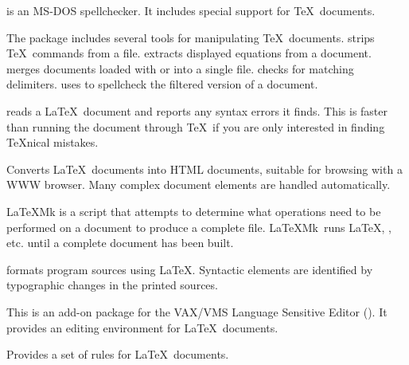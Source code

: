 
 is an MS-DOS spellchecker.  It includes special support
for \TeX\ documents.

\newpage
{}

The  package includes several tools for manipulating
\TeX\ documents.  strips \TeX\ commands from a file.
 extracts displayed equations from a document. 
 merges documents loaded with \verb|| or
\verb|| into a single file.  checks for
matching delimiters.   uses  to 
spellcheck the filtered version of a document.


 reads a \LaTeX\ document and reports any syntax
errors it finds.  This is faster than running the document through
\TeX\ if you are only interested in finding \TeX{}nical mistakes.


Converts \LaTeX\ documents into HTML documents, suitable for
browsing with a WWW browser.  Many complex document elements are handled
automatically.


\LaTeX{}Mk is a  script that attempts to determine what operations
need to be performed on a document to produce a complete 
 file.  \LaTeX{}Mk\ runs \LaTeX, \BibTeX, etc. until a complete
document has been built.


 formats program sources using \LaTeX.  Syntactic elements
are identified by typographic changes in the printed sources.


This is an add-on package for the VAX/VMS Language Sensitive Editor
().  It provides an editing environment for \LaTeX\
documents.


Provides a set of  rules for \LaTeX\ documents.


